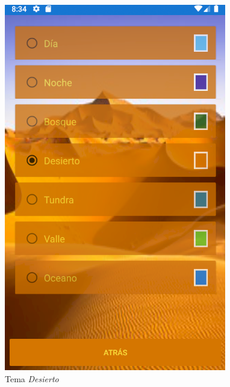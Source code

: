 \begin{figure}[H]
    \centering
    \includegraphics[scale=0.7]{Figures/Capturas/TemaDesierto.png}
    \caption{Tema \textit{Desierto}}
    \label{Desierto}    
\end{figure}
